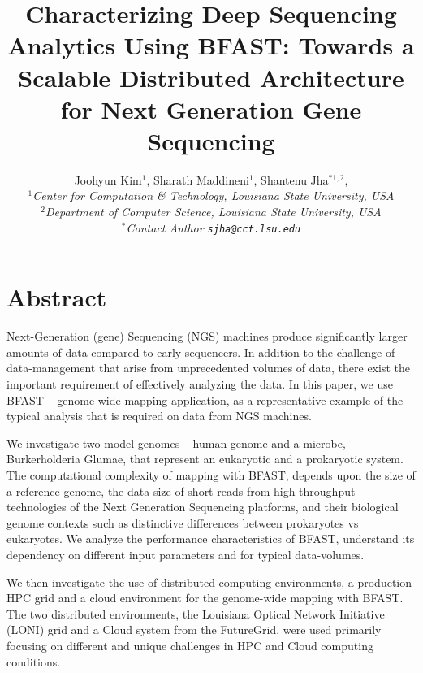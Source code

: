 \documentclass[12pt]{article}
\begin{document}
\title{Characterizing Deep Sequencing Analytics Using BFAST: Towards a
  Scalable Distributed Architecture for Next Generation Gene
  Sequencing}

\author{Joohyun Kim$^{1}$, Sharath Maddineni$^{1}$, Shantenu Jha$^{*1,2}$, \\
  \small{\emph{$^{1}$Center for Computation \& Technology, Louisiana State University, USA}}\\
  \small{\emph{$^{2}$Department of Computer Science, Louisiana State University, USA}}\\
  \small{\emph{$^{*}$Contact Author \texttt{sjha@cct.lsu.edu}}}
  }


\maketitle

\section*{Abstract}

Next-Generation (gene) Sequencing (NGS) machines produce significantly larger amounts of data compared to early sequencers.  In addition to the challenge of data-management that arise from unprecedented volumes of data, there exist the important requirement of effectively analyzing the data.  In this paper, we use BFAST -- genome-wide mapping application, as a representative example of the typical analysis that is required on data from NGS machines.  

We investigate two model genomes -- human genome and a microbe, Burkerholderia Glumae, that represent an eukaryotic and a prokaryotic system.  The computational complexity %
of mapping with BFAST, depends upon the size of a reference genome, the data size of short reads from high-throughput technologies of the Next Generation Sequencing platforms, and their biological genome contexts such as distinctive differences between prokaryotes vs eukaryotes.
We analyze the performance characteristics of BFAST, understand its dependency on different input parameters and for typical data-volumes. 

We then investigate the use of distributed computing environments, a production HPC grid and a cloud environment for the genome-wide mapping with BFAST.  The two distributed environments, the Louisiana Optical Network Initiative (LONI) grid and a Cloud system from the FutureGrid, were used primarily focusing on different and unique challenges in HPC and Cloud computing conditions.
\end{document}
